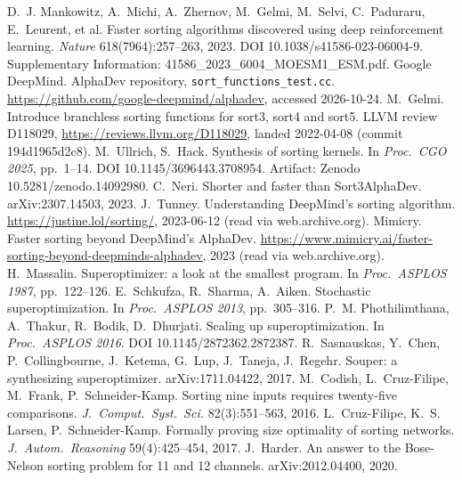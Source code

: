  D.~J. Mankowitz, A.~Michi, A.~Zhernov, M.~Gelmi, M.~Selvi, C.~Paduraru, E.~Leurent, et al.
Faster sorting algorithms discovered using deep reinforcement learning. \emph{Nature} 618(7964):257--263, 2023.
DOI 10.1038/s41586-023-06004-9. Supplementary Information: 41586\_2023\_6004\_MOESM1\_ESM.pdf.
 Google DeepMind. AlphaDev repository, \texttt{sort\_functions\_test.cc}.
\url{https://github.com/google-deepmind/alphadev}, accessed 2026-10-24.
 M.~Gelmi. Introduce branchless sorting functions for sort3, sort4 and sort5. LLVM review D118029,
\url{https://reviews.llvm.org/D118029}, landed 2022-04-08 (commit 194d1965d2c8).
 M.~Ullrich, S.~Hack. Synthesis of sorting kernels. In \emph{Proc.\ CGO 2025}, pp.~1--14.
DOI 10.1145/3696443.3708954. Artifact: Zenodo 10.5281/zenodo.14092980.
 C.~Neri. Shorter and faster than Sort3AlphaDev. arXiv:2307.14503, 2023.
 J.~Tunney. Understanding DeepMind's sorting algorithm. \url{https://justine.lol/sorting/}, 2023-06-12
(read via web.archive.org).
 Mimicry. Faster sorting beyond DeepMind's AlphaDev.
\url{https://www.mimicry.ai/faster-sorting-beyond-deepminds-alphadev}, 2023 (read via web.archive.org).
 H.~Massalin. Superoptimizer: a look at the smallest program. In \emph{Proc.\ ASPLOS 1987}, pp.~122--126.
 E.~Schkufza, R.~Sharma, A.~Aiken. Stochastic superoptimization. In \emph{Proc.\ ASPLOS 2013}, pp.~305--316.
 P.~M. Phothilimthana, A.~Thakur, R.~Bodik, D.~Dhurjati. Scaling up superoptimization. In
\emph{Proc.\ ASPLOS 2016}. DOI 10.1145/2872362.2872387.
 R.~Sasnauskas, Y.~Chen, P.~Collingbourne, J.~Ketema, G.~Lup, J.~Taneja, J.~Regehr. Souper: a synthesizing
superoptimizer. arXiv:1711.04422, 2017.
 M.~Codish, L.~Cruz-Filipe, M.~Frank, P.~Schneider-Kamp. Sorting nine inputs requires twenty-five
comparisons. \emph{J.\ Comput.\ Syst.\ Sci.} 82(3):551--563, 2016.
 L.~Cruz-Filipe, K.~S. Larsen, P.~Schneider-Kamp. Formally proving size optimality of sorting networks.
\emph{J.\ Autom.\ Reasoning} 59(4):425--454, 2017.
 J.~Harder. An answer to the Bose-Nelson sorting problem for 11 and 12 channels. arXiv:2012.04400, 2020.
